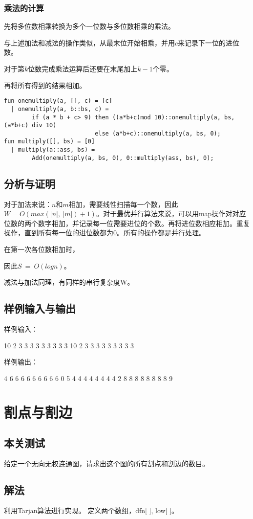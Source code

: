 \documentclass[UTF8,a4paperdui, %
]{ctexart}
\begin{document}
\subsubsection{乘法的计算}
先将多位数相乘转换为多个一位数与多位数相乘的乘法。

与上述加法和减法的操作类似，从最末位开始相乘，并用$c$来记录下一位的进位数。

对于第$k$位数完成乘法运算后还要在末尾加上$k-1$个零。

再将所有得到的结果相加。

\begin{lstlisting}
fun onemultiply(a, [], c) = [c]
  | onemultiply(a, b::bs, c) = 
        if (a * b + c> 9) then ((a*b+c)mod 10)::onemultiply(a, bs, (a*b+c) div 10)
                          else (a*b+c)::onemultiply(a, bs, 0);
fun multiply([], bs) = [0]
  | multiply(a::ass, bs) = 
        Add(onemultiply(a, bs, 0), 0::multiply(ass, bs), 0);
\end{lstlisting}


\subsection{分析与证明}
对于加法来说：$n$和$m$相加，需要线性扫描每一个数，因此$W=O(max(|n|,\ |m|)+1)$。对于最优并行算法来说，可以用map操作对对应位数的两个数字相加，并记录每一位需要进位的个数。再将进位数相应相加。重复操作，直到所有每一位的进位数都为0。所有的操作都是并行处理。

在第一次各位数相加时，

因此$S\ =\ O(logn)$。

减法与加法同理，有同样的串行复杂度W。
\subsection{样例输入与输出}
样例输入：

10 2 3 3 3 3 3 3 3 3 3 10 2 3 3 3 3 3 3 3 3 3

样例输出：

4 6 6 6 6 6 6 6 6 6 
0 
5 4 4 4 4 4 4 4 4 2 8 8 8 8 8 8 8 8 9 
\section{割点与割边}
\subsection{本关测试}
给定一个无向无权连通图，请求出这个图的所有割点和割边的数目。
\subsection{解法}
利用Tarjan算法进行实现。
定义两个数组，dfn[ ], low[ ]。
\end{document}
